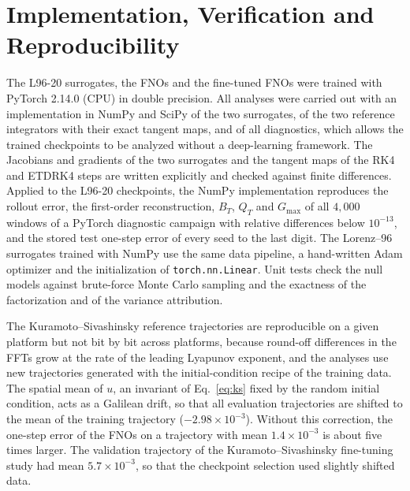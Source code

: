 \section{Implementation, Verification and Reproducibility}
\label{app:repro}

The L96-20 surrogates, the FNOs and the fine-tuned FNOs were trained with PyTorch 2.14.0 (CPU) in double precision. All analyses were carried out with an implementation in NumPy and SciPy of the two surrogates, of the two reference integrators with their exact tangent maps, and of all diagnostics, which allows the trained checkpoints to be analyzed without a deep-learning framework. The Jacobians and gradients of the two surrogates and the tangent maps of the RK4 and ETDRK4 steps are written explicitly and checked against finite differences. Applied to the L96-20 checkpoints, the NumPy implementation reproduces the rollout error, the first-order reconstruction, $B_T$, $Q_T$ and $G_{\max}$ of all $4{,}000$ windows of a PyTorch diagnostic campaign with relative differences below $10^{-13}$, and the stored test one-step error of every seed to the last digit. The Lorenz--96 surrogates trained with NumPy use the same data pipeline, a hand-written Adam optimizer and the initialization of \texttt{torch.nn.Linear}. Unit tests check the null models against brute-force Monte Carlo sampling and the exactness of the factorization and of the variance attribution.

The Kuramoto--Sivashinsky reference trajectories are reproducible on a given platform but not bit by bit across platforms, because round-off differences in the FFTs grow at the rate of the leading Lyapunov exponent, and the analyses use new trajectories generated with the initial-condition recipe of the training data. The spatial mean of $u$, an invariant of Eq.~\eqref{eq:ks} fixed by the random initial condition, acts as a Galilean drift, so that all evaluation trajectories are shifted to the mean of the training trajectory ($-2.98\times10^{-3}$). Without this correction, the one-step error of the FNOs on a trajectory with mean $1.4\times10^{-3}$ is about five times larger. The validation trajectory of the Kuramoto--Sivashinsky fine-tuning study had mean $5.7\times10^{-3}$, so that the checkpoint selection used slightly shifted data.
